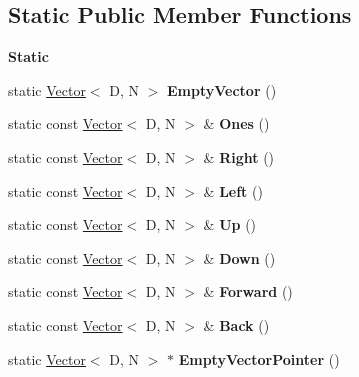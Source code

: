\subsection*{Static Public Member Functions}
\begin{Indent}\textbf{ Static}\par
\begin{DoxyCompactItemize}
\item 
\mbox{\label{classrev_1_1_vector_aea31cd9d862a3ead5fb4a168bbc94c38}} 
static \mbox{\hyperlink{classrev_1_1_vector}{Vector}}$<$ D, N $>$ {\bfseries Empty\+Vector} ()
\item 
\mbox{\label{classrev_1_1_vector_a337e9598fe431c5da01d511af68d2e4f}} 
static const \mbox{\hyperlink{classrev_1_1_vector}{Vector}}$<$ D, N $>$ \& {\bfseries Ones} ()
\item 
\mbox{\label{classrev_1_1_vector_a365f19708ed7be1e654b03ee7b84cf9c}} 
static const \mbox{\hyperlink{classrev_1_1_vector}{Vector}}$<$ D, N $>$ \& {\bfseries Right} ()
\item 
\mbox{\label{classrev_1_1_vector_af50869ec350b9e78aaa6617adef3f393}} 
static const \mbox{\hyperlink{classrev_1_1_vector}{Vector}}$<$ D, N $>$ \& {\bfseries Left} ()
\item 
\mbox{\label{classrev_1_1_vector_a033701ee774537ed95df5a1c0e2bf470}} 
static const \mbox{\hyperlink{classrev_1_1_vector}{Vector}}$<$ D, N $>$ \& {\bfseries Up} ()
\item 
\mbox{\label{classrev_1_1_vector_a2d44c6a4061e021959a78fd89f932038}} 
static const \mbox{\hyperlink{classrev_1_1_vector}{Vector}}$<$ D, N $>$ \& {\bfseries Down} ()
\item 
\mbox{\label{classrev_1_1_vector_a16c9991e3b1f0804baf660d58a57a7cb}} 
static const \mbox{\hyperlink{classrev_1_1_vector}{Vector}}$<$ D, N $>$ \& {\bfseries Forward} ()
\item 
\mbox{\label{classrev_1_1_vector_accbd597491bdd0f075380c65f2a87c65}} 
static const \mbox{\hyperlink{classrev_1_1_vector}{Vector}}$<$ D, N $>$ \& {\bfseries Back} ()
\item 
\mbox{\label{classrev_1_1_vector_a83fd531b19c0fc525214fad77125e1a8}} 
static \mbox{\hyperlink{classrev_1_1_vector}{Vector}}$<$ D, N $>$ $\ast$ {\bfseries Empty\+Vector\+Pointer} ()
\end{DoxyCompactItemize}
\end{Indent}
